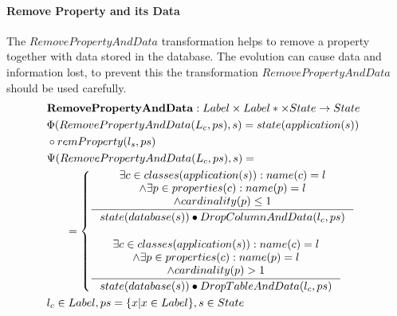 \documentclass[11pt]{article}
\begin{document}
\paragraph{Remove Property and its Data} The $RemovePropertyAndData$ transformation helps to remove a property together with data stored in the database. The evolution can cause data and information lost, to prevent this the transformation $RemovePropertyAndData$ should be used carefully.
\begin{align*}
&	\mathbf{RemovePropertyAndData} : Label \times Label* \times State \rightarrow State \\
&	\Phi(RemovePropertyAndData(L_c, ps), s) = state(application(s)) \\ 
&  \circ remProperty(l_s, ps) \\
&	\Psi(RemovePropertyAndData(L_c, ps), s) = \\
& \;\;\;\;\;\; = \begin{cases}
 		\inference{\exists c \in classes(application(s)) : name(c) = l\\ 	\wedge \exists p \in properties(c) : name(p) = l \\ \wedge cardinality(p) \leq 1}{state(database(s)) \bullet DropColumnAndData(l_c, ps)}\\\\
 	\inference{\exists c \in classes(application(s)) : name(c) = l\\ 	\wedge \exists p \in properties(c) : name(p) = l \\ \wedge cardinality(p) > 1}{state(database(s)) \bullet DropTableAndData(l_c, ps)}
 \end{cases}
	\\
&	l_c \in Label, ps = \{x | x \in Label\}, s \in State
\end{align*}
\end{document}
